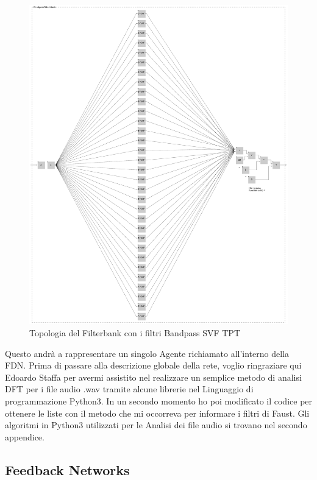 \begin{figure}[h!]
\begin{center}
    \includegraphics[width=15cm]{figures/BPFilterBank.pdf}
    \caption{Topologia del Filterbank con i filtri Bandpass SVF TPT}
\end{center}
\vspace{0.5cm}
\end{figure}

Questo andrà a rappresentare un singolo Agente richiamato all'interno della FDN.
Prima di passare alla descrizione globale della rete,
voglio ringraziare qui Edoardo Staffa per avermi assistito 
nel realizzare un semplice metodo di analisi DFT per i file audio .wav 
tramite alcune librerie nel Linguaggio di programmazione Python3.
In un secondo momento ho poi modificato il codice per 
ottenere le liste con il metodo che mi occorreva per informare i filtri di Faust.
Gli algoritmi in Python3 utilizzati per le Analisi dei file audio si trovano nel
secondo appendice.

\subsection{Feedback Networks}
\label{Feedback Networks}

